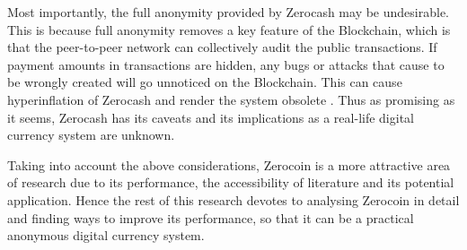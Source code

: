 Most importantly, the full anonymity provided by Zerocash may be undesirable. This is because full anonymity removes a key feature of the Blockchain, which is that the peer-to-peer network can collectively audit the public transactions. If payment amounts in transactions are hidden, any bugs or attacks that cause  to be wrongly created will go unnoticed on the Blockchain. This can cause hyperinflation of Zerocash and render the system obsolete \cite{Zcoin2016}. Thus as promising as it seems, Zerocash has its caveats and its implications as a real-life digital currency system are unknown. 

Taking into account the above considerations, Zerocoin is a more attractive area of research due to its performance, the accessibility of literature and its potential application. Hence the rest of this research devotes to analysing Zerocoin in detail and finding ways to improve its performance, so that it can be a practical anonymous digital currency system. 
